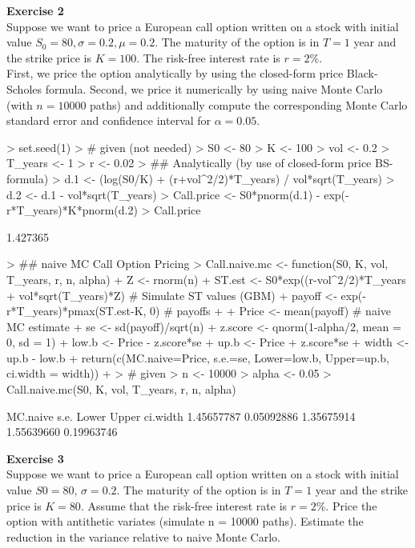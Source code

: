 \documentclass{article}
\begin{document}
\newpage
\textbf{Exercise 2} \\
Suppose we want to price a European call option written on a stock with initial value $S_0 = 80, \sigma = 0.2, \mu = 0.2$. The maturity of the option is in $T = 1$ year and the strike price is $K = 100$. The risk-free interest rate is $r = 2\%$.\\
First, we price the option analytically by using the closed-form price Black-Scholes formula. Second, we price it numerically by using naive Monte Carlo (with $n = 10000$ paths) and additionally compute the corresponding Monte Carlo standard error and confidence interval for $\alpha = 0.05$.
\begin{Schunk}
\begin{Sinput}
> set.seed(1)
> # given (\mu not needed)
> S0 <- 80
> K <- 100
> vol <- 0.2
> T_years <- 1
> r <- 0.02
> ## Analytically (by use of closed-form price BS-formula)
> d.1 <- (log(S0/K) + (r+vol^2/2)*T_years) / vol*sqrt(T_years)
> d.2 <- d.1 - vol*sqrt(T_years)
> Call.price <- S0*pnorm(d.1) - exp(-r*T_years)*K*pnorm(d.2)
> Call.price
\end{Sinput}
\begin{Soutput}
[1] 1.427365
\end{Soutput}
\begin{Sinput}
> ## naive MC Call Option Pricing
> Call.naive.mc <- function(S0, K, vol, T_years, r, n, alpha) {
+   Z <- rnorm(n)
+   ST.est <- S0*exp((r-vol^2/2)*T_years + vol*sqrt(T_years)*Z) # Simulate ST values (GBM)
+   payoff <- exp(-r*T_years)*pmax(ST.est-K, 0) # payoffs 
+   
+   Price <- mean(payoff)  # naive MC estimate
+   se <- sd(payoff)/sqrt(n)
+   z.score <- qnorm(1-alpha/2, mean = 0, sd = 1)
+   low.b <- Price - z.score*se
+   up.b <- Price + z.score*se
+   width <- up.b - low.b
+   return(c(MC.naive=Price, s.e.=se, Lower=low.b, Upper=up.b, ci.width = width))
+ }
> # given
> n <- 10000
> alpha <- 0.05
> Call.naive.mc(S0, K, vol, T_years, r, n, alpha)
\end{Sinput}
\begin{Soutput}
  MC.naive       s.e.      Lower      Upper   ci.width 
1.45657787 0.05092886 1.35675914 1.55639660 0.19963746 
\end{Soutput}
\end{Schunk}


\newpage
\textbf{Exercise 3} \\

Suppose we want to price a European call option written on a stock with initial value $S0 = 80$, $\sigma = 0.2$. The maturity of the option is in $T = 1$ year and the strike price is $K = 80$. Assume that the risk-free interest rate is $r = 2\%$. Price the option with antithetic variates (simulate n = 10000 paths). Estimate the reduction in
the variance relative to naive Monte Carlo.\\
\end{document}
